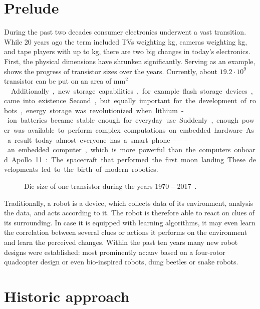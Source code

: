 \section{Prelude}

During the past two decades consumer electronics underwent a vast transition.
While 20 years ago the term included TVs weighting \unit[20]{kg}, cameras weighting \unit[3]{kg}, and tape players with up to \unit[5]{kg}, there are two big changes in today's electronics.
First, the physical dimensions have shrunken significantly.
Serving as an example,  shows the progress of transistor sizes over the years.
Currently, about $19.2 \cdot 10^9$ transistor can be put on an area of \unit[768]{mm$^{2}$}~\cite{amd2018epyca, amd2018epycb}.
Additionally, new storage capabilities, for example flash storage devices, came into existence.
Second, but equally important for the development of robots, energy storage was revolutionized when lithium-ion batteries became stable enough for everyday use.
Suddenly, enough power was available to perform complex computations on embedded hardware.
As a result today almost everyone has a smart phone --- an embedded computer, which is more powerful than the computers onboard Apollo 11: The spacecraft that performed the first moon landing.
These developments led to the birth of modern robotics.

\begin{figure}
  \centering
  
  \caption{Die size of one transistor during the years 1970 -- 2017~\cite{mueller2001microprocessor, rayes2017internet}.}
  \label{fig:introduction_transistorsize}
\end{figure}

Traditionally, a robot is a device, which collects data of its environment, ana\-ly\-sis the data, and acts according to it.
The robot  is therefore able to react on clues of its surrounding.
In case it is equipped with learning algorithms, it may even learn the correlation between several clues or actions it performs on the environment and learn the perceived changes.
Within the past ten years many new robot designs were established: most prominently \gls{ac:aav} based on a four-rotor quadcopter design or even bio-inspired robots, \eg dung beetles or snake robots.





\section{Historic approach}

